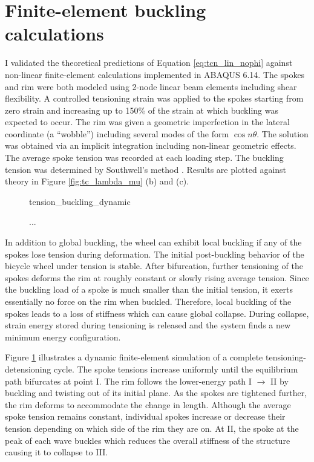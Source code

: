 \documentclass[\rootdir/thesis.tex]{subfiles}
\begin{document}
\section{Finite-element buckling calculations}

I validated the theoretical predictions of Equation \eqref{eq:tcn_lin_nophi} against non-linear finite-element calculations implemented in ABAQUS 6.14. The spokes and rim were both modeled using 2-node linear beam elements including shear flexibility. A controlled tensioning strain was applied to the spokes starting from zero strain and increasing up to 150\% of the strain at which buckling was expected to occur. The rim was given a geometric imperfection in the lateral coordinate (a ``wobble'') including several modes of the form $\cos{n\theta}$. The solution was obtained via an implicit integration including non-linear geometric effects. The average spoke tension was recorded at each loading step. The buckling tension was determined by Southwell's method \cite{}. Results are plotted against theory in Figure \ref{fig:tc_lambda_mu} (b) and (c).

\begin{figure}
\centering
{tension_buckling_dynamic}
\caption{...}
\label{fig:tension_buckling_dynamic}
\end{figure}

In addition to global buckling, the wheel can exhibit local buckling if any of the spokes lose tension during deformation. The initial post-buckling behavior of the bicycle wheel under tension is stable. After bifurcation, further tensioning of the spokes deforms the rim at roughly constant or slowly rising average tension. Since the buckling load of a spoke is much smaller than the initial tension, it exerts essentially no force on the rim when buckled. Therefore, local buckling of the spokes leads to a loss of stiffness which can cause global collapse. During collapse, strain energy stored during tensioning is released and the system finds a new minimum energy configuration.

Figure \ref{fig:tension_buckling_dynamic} illustrates a dynamic finite-element simulation of a complete tensioning-detensioning cycle. The spoke tensions increase uniformly until the equilibrium path bifurcates at point I. The rim follows the lower-energy path I $\rightarrow$ II by buckling and twisting out of its initial plane. As the spokes are tightened further, the rim deforms to accommodate the change in length. Although the average spoke tension remains constant, individual spokes increase or decrease their tension depending on which side of the rim they are on. At II, the spoke at the peak of each wave buckles which reduces the overall stiffness of the structure causing it to collapse to III.
\end{document}
